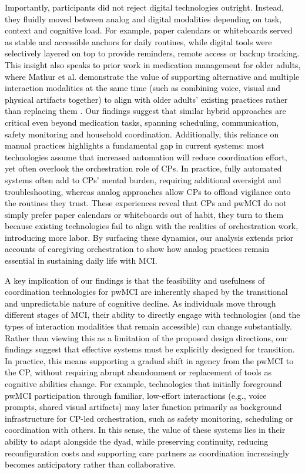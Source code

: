 \documentclass[acmsmall]{acmart}
\begin{document}
\textcolor{black}{Importantly, participants did not reject digital technologies outright. Instead, they fluidly moved between analog and digital modalities depending on task, context and cognitive load. For example, paper calendars or whiteboards served as stable and accessible anchors for daily routines, while digital tools were selectively layered on top to provide reminders, remote access or backup tracking. This insight also speaks to prior work in medication management for older adults, where Mathur et al. demonstrate the value of supporting alternative and multiple interaction \textcolor{black}{modalities} at the same time (such as combining voice, visual and physical artifacts together) to align with older adults’ existing practices rather than replacing them \cite{mathur2022collaborative}. Our findings suggest that similar hybrid approaches are critical even beyond medication tasks, spanning scheduling, communication, safety monitoring and household coordination.} \textcolor{black}{\textcolor{black}{Additionally, \textcolor{black}{this} reliance on manual practices highlights a fundamental gap in current systems: most technologies assume that increased automation will reduce coordination effort, yet often overlook the orchestration role of CPs.} In practice, fully automated systems often add to CPs’ mental burden, requiring additional oversight and troubleshooting, whereas analog approaches allow CPs to offload vigilance onto the routines they trust. These experiences reveal that CPs and pwMCI do not simply prefer paper calendars or whiteboards out of habit, they turn to them because existing technologies fail to align with the realities of orchestration work, introducing more labor. By surfacing these dynamics, our analysis extends prior accounts of caregiving orchestration to show how analog practices remain essential in sustaining daily life with MCI.} 

\textcolor{black}{A key implication of our findings is that the feasibility and usefulness of coordination technologies for pwMCI are inherently shaped by the transitional and unpredictable nature of cognitive decline. As individuals move through different stages of MCI, their ability to directly engage with technologies (and the types of interaction modalities that remain accessible) can change substantially. Rather than viewing this as a limitation of the proposed design directions, our findings suggest that effective systems must be explicitly designed for transition. In practice, this means supporting a gradual shift in agency from the pwMCI to the CP, without requiring abrupt abandonment or replacement of tools as cognitive abilities change. For example, technologies that initially foreground pwMCI participation through familiar, low-effort interactions (e.g., voice prompts, shared visual artifacts) may later function primarily as background infrastructure for CP-led orchestration, such as safety monitoring, scheduling or coordination with others. In this sense, the value of these systems \textcolor{black}{lies in} their ability to adapt alongside the dyad, while preserving continuity, reducing reconfiguration costs and supporting care partners as coordination increasingly becomes anticipatory rather than collaborative.}
\end{document}
